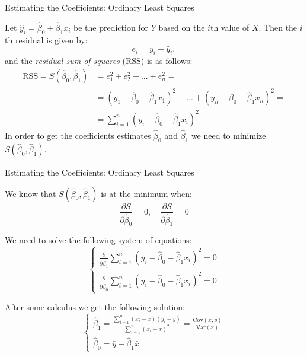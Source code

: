 \begin{frame}{Estimating the Coefficients: Ordinary Least Squares}

    Let $\hat{y}_i = \hat{\beta}_0 + \hat{\beta}_1 x_i$ be the prediction for $Y$ based on the $i$th value of $X$. Then the $i$th residual is given by:
    \begin{equation*}
    e_i = y_i - \hat{y}_i,
    \end{equation*}
    and the \emph{residual sum of squares} (RSS) is as follows:
    \begin{align*}
    \text{RSS} = S(\hat{\beta}_0, \hat{\beta}_1) &= e_1^2 + e_2^2 + ... + e_n^2 =\\
                &= (y_1 - \hat{\beta}_0 - \hat{\beta}_1 x_1)^2 + ... + (y_n - \hat{\beta}_0 - \hat{\beta}_1 x_n)^2 =\\
                &= \sum_{i=1}^{n} (y_i - \hat{\beta}_0 - \hat{\beta}_1 x_i)^2
    \end{align*}
    In order to get the coefficients estimates $\hat{\beta}_0$ and $\hat{\beta}_1$ we need to minimize $S(\hat{\beta}_0, \hat{\beta}_1)$.

\end{frame}

\begin{frame}{Estimating the Coefficients: Ordinary Least Squares}
    \label{page:lm-coefficients}
    
    We know that $S(\hat{\beta}_0, \hat{\beta}_1)$ is at the minimum when:
    \begin{equation*}
    \frac{\partial S}{\partial \hat{\beta}_0} = 0,\quad \frac{\partial S}{\partial \hat{\beta}_1} = 0
    \end{equation*}

    We need to solve the following system of equations:    
    \begin{equation*}
    \left\{
    \begin{array}{ll}        
    \frac{\partial}{\partial \hat{\beta}_1} \sum_{i=1}^{n} (y_i - \hat{\beta}_0 - \hat{\beta}_1 x_i)^2 = 0\\
    \frac{\partial}{\partial \hat{\beta}_0} \sum_{i=1}^{n} (y_i - \hat{\beta}_0 - \hat{\beta}_1 x_i)^2 = 0
    \end{array}
    \right.
    \end{equation*}
    
    After some calculus we get the following solution:
    \begin{equation}\label{eq:lm-coefficients}
    \left\{
    \begin{array}{ll}        
    \hat{\beta}_1 = \frac{\sum_{i=1}^{n} (x_i - \bar{x})(y_i - \bar{y})}{\sum_{i=1}^{n} (x_i - \bar{x})^2} = \frac{\text{Cov}(x,y)}{\text{Var}(x)}\\
    \hat{\beta}_0 = \bar{y} - \hat{\beta}_1 \bar{x}
    \end{array}
    \right.
    \end{equation}
    
\end{frame}

